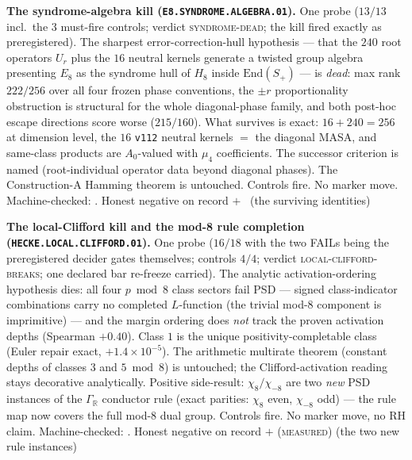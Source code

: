 \documentclass[11pt,a4paper]{article}
\theoremstyle{definition}
\begin{document}
\par\smallskip\noindent\textbf{The syndrome-algebra kill
(\texttt{E8.SYNDROME.ALGEBRA.01}).}
One probe ($13/13$ incl.\ the $3$ must-fire controls; verdict
\textsc{syndrome-dead}; the kill fired exactly as preregistered).
The sharpest error-correction-hull hypothesis --- that the $240$
root operators $U_r$ plus the $16$ neutral kernels generate a
twisted group algebra presenting $E_8$ as the syndrome hull of
$H_8$ inside $\mathrm{End}(S_+)$ --- is \emph{dead}: max rank
$222/256$ over all four frozen phase conventions, the $\pm r$
proportionality obstruction is structural for the whole
diagonal-phase family, and both post-hoc escape directions score
worse ($215/160$).  What survives is exact: $16+240=256$ at
dimension level, the $16$ \texttt{v112} neutral kernels $=$ the
diagonal MASA, and same-class products are $A_0$-valued with
$\mu_4$ coefficients.  The successor criterion is named
(root-individual operator data beyond diagonal phases).  The
Construction-A Hamming theorem is untouched.  Controls fire.  No
marker move.
Machine-checked: .
Honest negative on record $+$ \mE\ (the surviving identities)
\par\smallskip

\par\smallskip\noindent\textbf{The local-Clifford kill and the
mod-8 rule completion (\texttt{HECKE.LOCAL.CLIFFORD.01}).}
One probe ($16/18$ with the two FAILs being the preregistered
decider gates themselves; controls $4/4$; verdict
\textsc{local-clifford-breaks}; one declared bar re-freeze
carried).  The analytic activation-ordering hypothesis dies: all
four $p\bmod8$ class sectors fail PSD --- signed class-indicator
combinations carry no completed $L$-function (the trivial mod-8
component is imprimitive) --- and the margin ordering does
\emph{not} track the proven activation depths (Spearman $+0.40$).
Class $1$ is the unique positivity-completable class (Euler repair
exact, $+1.4\times10^{-5}$).  The arithmetic multirate theorem
(constant depths of classes $3$ and $5\bmod8$) is untouched; the
Clifford-activation reading stays decorative analytically.
Positive side-result: $\chi_8/\chi_{-8}$ are two \emph{new} PSD
instances of the $\Gamma_{\mathbb R}$ conductor rule (exact
parities: $\chi_8$ even, $\chi_{-8}$ odd) --- the rule map now
covers the full mod-8 dual group.  Controls fire.  No marker move,
no RH claim.
Machine-checked: .
Honest negative on record $+$ (\textsc{measured}) (the two new rule
instances)
\par\smallskip
\end{document}
